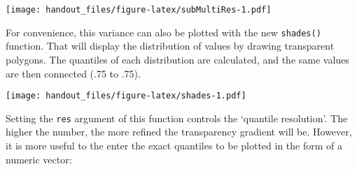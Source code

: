 \documentclass[]{article}
\newenvironment{Shaded}{\begin{snugshade}}{\end{snugshade}}
\newcommand{\KeywordTok}[1]{\textcolor[rgb]{0.13,0.29,0.53}{\textbf{{#1}}}}
\newcommand{\DataTypeTok}[1]{\textcolor[rgb]{0.13,0.29,0.53}{{#1}}}
\newcommand{\DecValTok}[1]{\textcolor[rgb]{0.00,0.00,0.81}{{#1}}}
\newcommand{\FloatTok}[1]{\textcolor[rgb]{0.00,0.00,0.81}{{#1}}}
\newcommand{\StringTok}[1]{\textcolor[rgb]{0.31,0.60,0.02}{{#1}}}
\newcommand{\NormalTok}[1]{{#1}}
\begin{document}
\texttt{[image: handout\_files/figure-latex/subMultiRes-1.pdf]}

For convenience, this variance can also be plotted with the new
\texttt{shades()} function. That will display the distribution of values
by drawing transparent polygons. The quantiles of each distribution are
calculated, and the same values are then connected (.75 to .75).

\begin{Shaded}
\end{Shaded}

\texttt{[image: handout\_files/figure-latex/shades-1.pdf]}

Setting the \texttt{res} argument of this function controls the
`quantile resolution'. The higher the number, the more refined the
transparency gradient will be. However, it is more useful to the enter
the exact quantiles to be plotted in the form of a numeric vector:

\begin{Shaded}
\end{Shaded}
\end{document}

